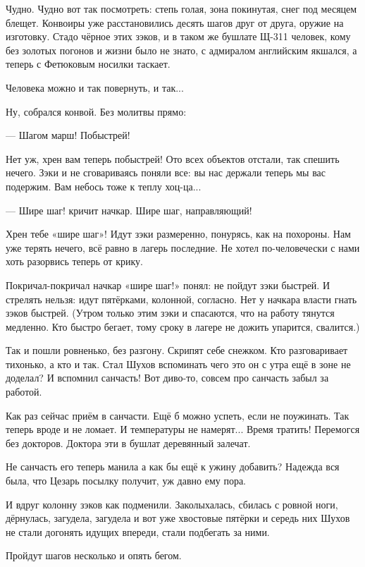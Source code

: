 Чудно. Чудно вот так посмотреть: степь голая, зона покинутая, снег под месяцем блещет.
Конвоиры уже расстановились \dash десять шагов друг от друга, оружие на изготовку. Стадо чёрное
этих зэков, и в таком же бушлате Щ-311 \dash человек, кому без золотых погонов и жизни было не
знато, с адмиралом английским якшался, а теперь с Фетюковым носилки таскает.

Человека можно и так повернуть, и так...

Ну, собрался конвой. Без молитвы прямо:

--- Шагом марш! Побыстрей!

Нет уж, хрен вам теперь \dash побыстрей! Ото всех объектов отстали, так спешить нечего. Зэки и не
сговариваясь поняли все: вы нас держали \dash теперь мы вас подержим. Вам небось тоже к теплу
хоц-ца...

--- Шире шаг! \dash кричит начкар. \Dash Шире шаг, направляющий!

Хрен тебе \dash «шире шаг»! Идут зэки размеренно, понурясь, как на похороны. Нам уже терять
нечего, всё равно в лагерь последние. Не хотел по-человечески с нами \dash хоть разорвись теперь
от крику.

Покричал-покричал начкар «шире шаг!» \dash понял: не пойдут зэки быстрей. И стрелять нельзя: идут
пятёрками, колонной, согласно. Нет у начкара власти гнать зэков быстрей. (Утром только этим
зэки и спасаются, что на работу тянутся медленно. Кто быстро бегает, тому сроку в лагере не
дожить \dash упарится, свалится.)

Так и пошли ровненько, без разгону. Скрипят себе снежком. Кто разговаривает тихонько, а кто и
так. Стал Шухов вспоминать \dash чего это он с утра ещё в зоне не доделал? И вспомнил \dash санчасть!
Вот диво-то, совсем про санчасть забыл за работой.

Как раз сейчас приём в санчасти. Ещё б можно успеть, если не поужинать. Так теперь вроде и не
ломает. И температуры не намерят... Время тратить! Перемогся без докторов. Доктора эти в
бушлат деревянный залечат.

Не санчасть его теперь манила \dash а как бы ещё к ужину добавить? Надежда вся была, что Цезарь
посылку получит, уж давно ему пора.

И вдруг колонну зэков как подменили. Заколыхалась, сбилась с ровной ноги, дёрнулась,
загудела, загудела \dash и вот уже хвостовые пятёрки и середь них Шухов не стали догонять идущих
впереди, стали подбегать за ними.

Пройдут шагов несколько и опять бегом.

